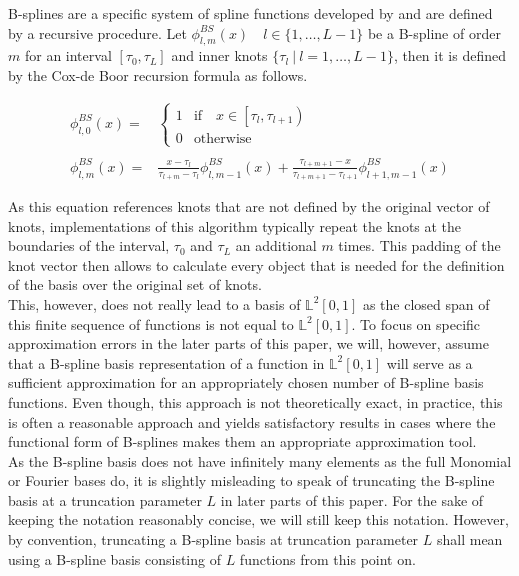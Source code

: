 \documentclass[11pt,twoside,a4paper]{article}
\begin{document}
	B-splines are a specific system of spline functions developed by \cite{de_boor_practical_1978} and are defined by a recursive procedure. Let $\phi_{l,m}^{BS}(x) \quad l \in \{1,\dots,L-1\}$ be a B-spline of order $m$ for an interval $[\tau_0, \tau_L]$ and inner knots $\{\tau_l \: \vert \: l = 1,\dots, L-1\}$, then it is defined by the Cox-de Boor recursion formula as follows. 
	
	\begin{equation}
		\begin{split}
			\phi_{l,0}^{BS}(x) = &
			\begin{cases}
				1 & \text{if} \quad x \in \left[\tau_l, \tau_{l+1}\right)\\
				0 & \text{otherwise}
			\end{cases}\\ \\
			\phi_{l,m}^{BS}(x) = &\frac{x - \tau_l}{\tau_{l+m} - \tau_l} \phi_{l,m-1}^{BS}(x) + \frac{\tau_{l+m+1} - x}{\tau_{l+m+1} - \tau_{l+1}} \phi_{l+1,m-1}^{BS}(x)
		\end{split}
	\end{equation}
	
	As this equation references knots that are not defined by the original vector of knots, implementations of this algorithm typically repeat the knots at the boundaries of the interval, $\tau_0$ and $\tau_L$ an additional $m$ times. This padding of the knot vector then allows to calculate every object that is needed for the definition of the basis over the original set of knots.\\
	
	This, however, does not really lead to a basis of $\mathbb{L}^2[0,1]$ as the closed span of this finite sequence of functions is not equal to $\mathbb{L}^2[0,1]$. To focus on specific approximation errors in the later parts of this paper, we will, however, assume that a B-spline basis representation of a function in $\mathbb{L}^2[0,1]$ will serve as a sufficient approximation for an appropriately chosen number of B-spline basis functions. 
	Even though, this approach is not theoretically exact, in practice, this is often a reasonable approach and yields satisfactory results in cases where the functional form of B-splines makes them an appropriate approximation tool. \\
	
	As the B-spline basis does not have infinitely many elements as the full Monomial or Fourier bases do, it is slightly misleading to speak of truncating the B-spline basis at a truncation parameter $L$ in later parts of this paper. For the sake of keeping the notation reasonably concise, we will still keep this notation. However, by convention, truncating a B-spline basis at truncation parameter $L$ shall mean using a B-spline basis consisting of $L$ functions from this point on.
	
\end{document}
